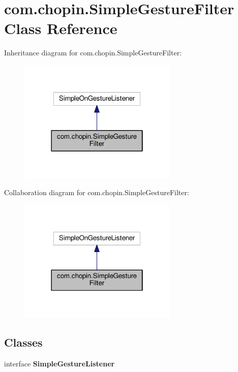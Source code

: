 \hypertarget{classcom_1_1chopin_1_1SimpleGestureFilter}{}\section{com.\+chopin.\+Simple\+Gesture\+Filter Class Reference}
\label{classcom_1_1chopin_1_1SimpleGestureFilter}


Inheritance diagram for com.\+chopin.\+Simple\+Gesture\+Filter\+:\nopagebreak
\begin{figure}[H]
\begin{center}
\leavevmode
\includegraphics[width=214pt]{classcom_1_1chopin_1_1SimpleGestureFilter__inherit__graph}
\end{center}
\end{figure}


Collaboration diagram for com.\+chopin.\+Simple\+Gesture\+Filter\+:\nopagebreak
\begin{figure}[H]
\begin{center}
\leavevmode
\includegraphics[width=214pt]{classcom_1_1chopin_1_1SimpleGestureFilter__coll__graph}
\end{center}
\end{figure}
\subsection*{Classes}
\begin{DoxyCompactItemize}
\item 
interface {\bfseries Simple\+Gesture\+Listener}
\end{DoxyCompactItemize}
